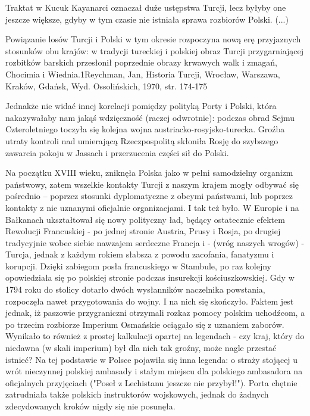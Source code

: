 Traktat w Kucuk Kayanarci oznaczał duże ustępstwa Turcji, lecz byłyby one jeszcze większe, gdyby w tym czasie nie istniała sprawa rozbiorów Polski. (...)

Powiązanie losów Turcji i Polski w tym okresie rozpoczyna nową erę przyjaznych stosunków obu krajów: w tradycji tureckiej i polskiej obraz Turcji przygarniającej rozbitków barskich przesłonił poprzednie obrazy krwawych walk i zmagań, Chocimia i Wiednia.1Reychman, Jan, Historia Turcji, Wrocław, Warszawa, Kraków, Gdańsk, Wyd. Ossolińskich, 1970, str. 174-175

Jednakże nie widać innej korelacji pomiędzy polityką Porty i Polski, która nakazywałaby nam jakąś wdzięczność (raczej odwrotnie): podczas obrad Sejmu Czteroletniego toczyła się kolejna wojna austriacko-rosyjsko-turecka. Groźba utraty kontroli nad umierającą Rzeczpospolitą skłoniła Rosję do szybszego zawarcia pokoju w Jassach i przerzucenia części sił do Polski.

Na początku XVIII wieku, zniknęła Polska jako w pełni samodzielny organizm państwowy, zatem wszelkie kontakty Turcji z naszym krajem mogły odbywać się pośrednio – poprzez stosunki dyplomatyczne z obcymi państwami, lub poprzez kontakty z nie uznanymi oficjalnie organizacjami. I tak też było. W Europie i na Bałkanach ukształtował się nowy polityczny ład, będący ostatecznie efektem Rewolucji Francuskiej - po jednej stronie Austria, Prusy i Rosja, po drugiej tradycyjnie wobec siebie nawzajem serdeczne Francja i - (wróg naszych wrogów) - Turcja, jednak z każdym rokiem słabsza z powodu zacofania, fanatyzmu i korupcji. Dzięki zabiegom posła francuskiego w Stambule, po raz kolejny opowiedziała się po polskiej stronie podczas insurekcji kościuszkowskiej. Gdy w 1794 roku do stolicy dotarło dwóch wysłanników naczelnika powstania, rozpoczęła nawet przygotowania do wojny. I na nich się skończyło. Faktem jest jednak, iż paszowie przygraniczni otrzymali rozkaz pomocy polskim uchodźcom, a po trzecim rozbiorze Imperium Osmańskie ociągało się z uznaniem zaborów. Wynikało to również z prostej kalkulacji opartej na legendach - czy kraj, który do niedawna (w skali imperium) był dla nich tak groźny, może nagle przestać istnieć? Na tej podstawie w Polsce pojawiła się inna legenda: o straży stojącej u wrót nieczynnej polskiej ambasady i stałym miejscu dla polskiego ambasadora na oficjalnych przyjęciach ("Poseł z Lechistanu jeszcze nie przybył!"). Porta chętnie zatrudniała także polskich instruktorów wojskowych, jednak do żadnych zdecydowanych kroków nigdy się nie posunęła.

